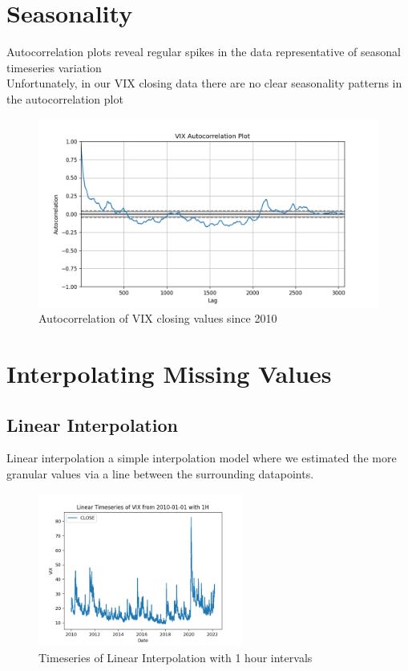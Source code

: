 \documentclass{article}
\begin{document}
\section{Seasonality}

Autocorrelation plots reveal regular spikes in the data representative of seasonal timeseries variation \\
Unfortunately, in our VIX closing data there are no clear seasonality patterns in the autocorrelation plot
\begin{figure}[h!]
    \centering
    \includegraphics[width= 1\textwidth]{VIX_close_autocorrelation_2010.png}
    \caption{Autocorrelation of VIX closing values since 2010}
\end{figure}

\newpage

\section{Interpolating Missing Values}

\subsection{Linear Interpolation}
Linear interpolation a simple interpolation model where we estimated the more granular values via a line between the surrounding datapoints.

\begin{figure}[h!]
    \centering
    \includegraphics[width= 0.6\textwidth]{VIX_linear_interpolation_2010_1H.png}
    \caption{Timeseries of Linear Interpolation with 1 hour intervals}
\end{figure}
\end{document}
